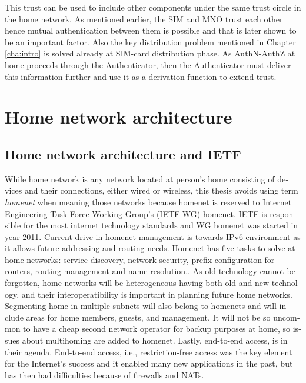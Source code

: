 \documentclass[12pt,a4paper,english]{tutthesis}
\begin{document}
\begin{otherlanguage}{english}
This trust can be used to include other components under the
same trust circle in the home network. As mentioned earlier, the SIM
and MNO trust each other hence mutual authentication between them is
possible and that is later shown to be an important factor.  Also the
key distribution problem mentioned in Chapter \ref{cha:intro} is solved
already at SIM-card distribution phase.  As AuthN-AuthZ at home
proceeds through the Authenticator, then the Authenticator must
deliver this information further and use it as a derivation function
to extend trust.




\chapter{Home network architecture}
\label{sec-3}

\section{Home network architecture and IETF}
\label{sec-3-1}


While home network is any network located at person's home consisting
of devices and their connections, either wired or wireless,
this thesis avoids using term \emph{homenet} when meaning those networks
because  homenet  is  reserved to 
Internet Engineering Task Force Working Group's (IETF
WG) homenet. IETF is responsible for the most internet technology standards and 
WG homenet was started in year 2011.
Current drive in homenet management is towards IPv6 environment
 as it allows future addressing and routing needs. 
Homenet has five tasks to solve at home networks: service discovery, network security, 
prefix configuration for routers, routing management and name
resolution.\cite{homenet-charter}.
As old technology cannot be forgotten, home networks will be heterogeneous having both
old and new technology, and their interoperatibility is important in
planning future home networks. 
Segmenting home in multiple subnets will also belong
to homenets and will include areas for home members, guests,
and management. It will not be so uncommon to have a cheap second
network operator for backup purposes at home, so issues about
multihoming are added to homenet.
Lastly, end-to-end access, is in their
agenda. End-to-end access, i.e., restriction-free access was the key
element for the Internet's success and it enabled many new
applications in the past, but has then had difficulties because of
firewalls and NATs.




\end{otherlanguage}
\end{document}
